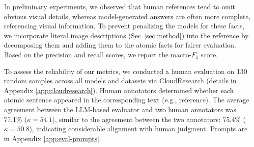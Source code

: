 In preliminary experiments, we observed that human references tend to omit obvious visual details, whereas model-generated answers are often more complete, referencing visual information. To prevent penalizing the models for these facts, we incorporate literal image descriptions (Sec~\ref{sec:method}) into the reference by decomposing them and adding them to the atomic facts for fairer evaluation. Based on the precision and recall scores, we report the macro-$F_1$ score.

To assess the reliability of our metrics, we conducted a human evaluation on 130 random samples across all models and datasets via CloudResearch (details in Appendix \ref{app:cloudresearch}). Human annotators determined whether each atomic sentence appeared in the corresponding text (e.g., reference). The average agreement between the LLM-based evaluator and two human annotators was 77.1\% (\(\kappa = 54.1\)), similar to the agreement between the two annotators: 75.4\% (\(\kappa = 50.8\)), indicating considerable alignment with human judgment. Prompts are in Appendix \ref{app:eval-prompts}.
